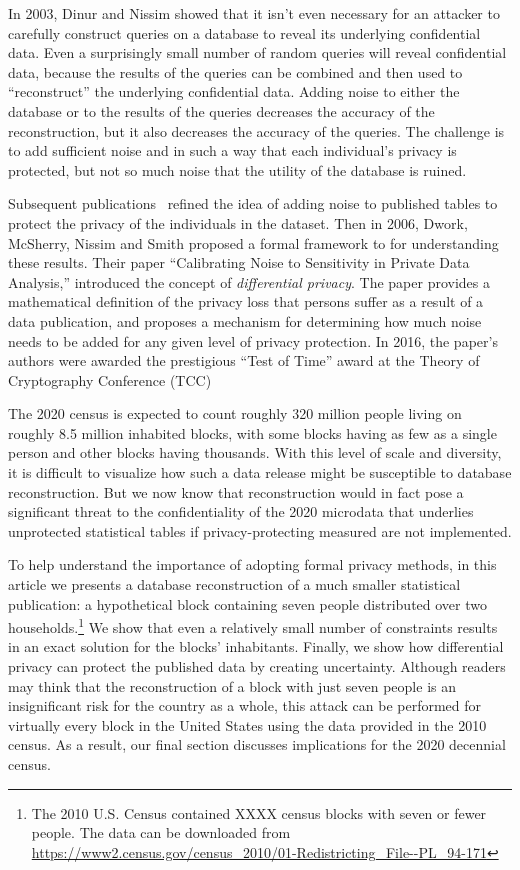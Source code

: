 \documentclass[runningheads]{llncs}
\begin{document}
In 2003, Dinur and Nissim showed that it isn't even necessary for an attacker to carefully construct queries on a database to reveal its underlying confidential data. Even a surprisingly small number of random queries will reveal confidential data, because the results of the queries can be combined and then used to ``reconstruct'' the underlying confidential data. Adding noise to either the database or to the results of the queries decreases the accuracy of the reconstruction, but it also decreases the accuracy of the queries. The challenge is to add sufficient noise and in such a way that each individual's privacy is protected, but not so much noise that the utility of the database is ruined. 

Subsequent
publications~\cite{privacy-preserving-datamining-on-vertically-partitioned-databases,BDMN05}
refined the idea of adding noise to published tables to protect the
privacy of the individuals in the dataset. Then in 2006, Dwork, McSherry, Nissim and Smith proposed a formal framework
to for understanding these results. Their paper ``Calibrating Noise to Sensitivity in Private Data
Analysis,''\cite{Dwork:2006:CNS:2180286.2180305} 
introduced the concept of \emph{differential privacy}. The paper
provides a mathematical definition of the privacy loss that
persons suffer as a result of a data publication, and proposes a
mechanism for determining how much noise needs to be added for any
given level of privacy protection. In 2016, the paper's authors were awarded the
prestigious ``Test of Time'' award at the Theory of Cryptography
Conference (TCC)

The 2020 census is expected to count roughly 320 million people living
on roughly 8.5 million inhabited blocks, with some blocks having as
few as a single person and other blocks having thousands. With this
level of scale and diversity, it is difficult to visualize how such a
data release might be susceptible to database reconstruction. But we
now know that reconstruction would in fact pose a significant threat
to the confidentiality of the 2020 microdata that underlies
unprotected statistical tables if privacy-protecting measured are not
implemented. 

To help understand the importance of adopting formal privacy methods, in
this article we presents a database reconstruction of a much
smaller statistical publication: a hypothetical block containing seven
people distributed over two households.\footnote{The 2010 U.S. Census contained XXXX census blocks with seven or fewer people. The data can be downloaded from \url{https://www2.census.gov/census_2010/01-Redistricting_File--PL_94-171}} We show that even a relatively
small number of constraints results in an exact solution for the blocks'
inhabitants. Finally, we show how differential privacy can protect the
published data by creating uncertainty. Although readers may think
that the reconstruction of a block with just seven people is an
insignificant risk for the country as a whole, this attack can be
performed for virtually every block in the United States using the
data provided in the 2010 census. As a result, our final section discusses
implications for the 2020 decennial census.
\end{document}
